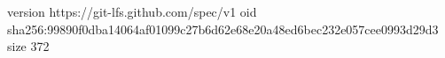 version https://git-lfs.github.com/spec/v1
oid sha256:99890f0dba14064af01099c27b6d62e68e20a48ed6bec232e057cee0993d29d3
size 372
